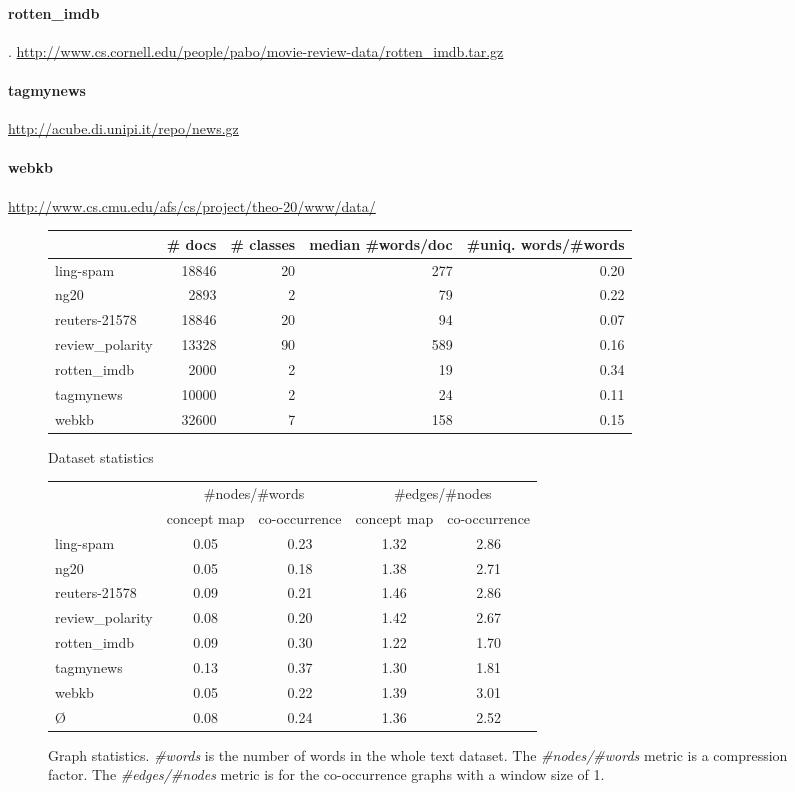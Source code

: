 \paragraph{rotten\_imdb}
\cite{Pang2004}.
\url{http://www.cs.cornell.edu/people/pabo/movie-review-data/rotten_imdb.tar.gz}

\paragraph{tagmynews}
\url{http://acube.di.unipi.it/repo/news.gz}

\paragraph{webkb}
\url{http://www.cs.cmu.edu/afs/cs/project/theo-20/www/data/}

\begin{figure}[ht]
\centering
\begin{tabular}{lrrrr}
{} &  \# docs &  \# classes &  median \#words/doc &  \#uniq. words/\#words \\
\midrule
ling-spam       & 18846 & 20 & 277 & 0.20 \\
ng20            & 2893 & 2 & 79 & 0.22 \\
reuters-21578   & 18846 & 20 & 94 & 0.07 \\
review\_polarity & 13328 & 90 & 589 & 0.16 \\
rotten\_imdb     & 2000 & 2 & 19 & 0.34 \\
tagmynews       & 10000 & 2 & 24 & 0.11 \\
webkb           & 32600 & 7 & 158 & 0.15 \\
\bottomrule
\end{tabular}
\caption{Dataset statistics}
\end{figure}

\begin{figure}[ht]
\centering
\begin{tabular}{lcccc}
{} &  \multicolumn{2}{c}{\#nodes/\#words} &  \multicolumn{2}{c}{\#edges/\#nodes} \\
{} & concept map &  co-occurrence &  concept map &  co-occurrence \\
\midrule
ling-spam       & 0.05 & 0.23 & 1.32 & 2.86 \\
ng20            & 0.05 & 0.18 & 1.38 & 2.71 \\
reuters-21578   & 0.09 & 0.21 & 1.46 & 2.86 \\
review\_polarity & 0.08 & 0.20 & 1.42 & 2.67 \\
rotten\_imdb     & 0.09 & 0.30 & 1.22 & 1.70 \\
tagmynews       & 0.13 & 0.37 & 1.30 & 1.81 \\
webkb           & 0.05 & 0.22 & 1.39 & 3.01 \\
\midrule
\O{}            & 0.08 & 0.24 & 1.36 & 2.52 \\
\bottomrule
\end{tabular}
\caption{Graph statistics. \textit{\#words} is the number of words in the whole text dataset. The \textit{\#nodes/\#words} metric is a compression factor. The \textit{\#edges/\#nodes} metric is for the co-occurrence graphs with a window size of 1.}
\end{figure}

